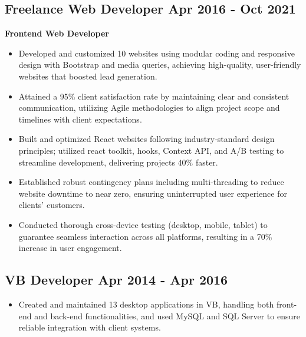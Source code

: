 \documentclass[a4paper,10pt]{article}
\newcommand{\dateright}[1]{\hfill \small \textbf{#1}}
\begin{document}
\subsection*{Freelance Web Developer \dateright{Apr 2016 - Oct 2021}}
\noindent\textbf{Frontend Web Developer}
\begin{itemize}
    \item Developed and customized 10 websites using modular coding and responsive design with Bootstrap and media queries, achieving high-quality, user-friendly websites that boosted lead generation.
    \item Attained a 95\% client satisfaction rate by maintaining clear and consistent communication, utilizing Agile methodologies to align project scope and timelines with client expectations.
    \item Built and optimized React websites following industry-standard design principles; utilized react toolkit, hooks, Context API, and A/B testing to streamline development, delivering projects 40\% faster.
    \item Established robust contingency plans including multi-threading to reduce website downtime to near zero, ensuring uninterrupted user experience for clients’ customers.
    \item Conducted thorough cross-device testing (desktop, mobile, tablet) to guarantee seamless interaction across all platforms, resulting in a 70\% increase in user engagement.
\end{itemize}

\subsection*{VB Developer \dateright{Apr 2014 - Apr 2016}}
\begin{itemize}
    \item Created and maintained 13 desktop applications in VB, handling both front-end and back-end functionalities, and used MySQL and SQL Server to ensure reliable integration with client systems.
\end{itemize}
\end{document}
